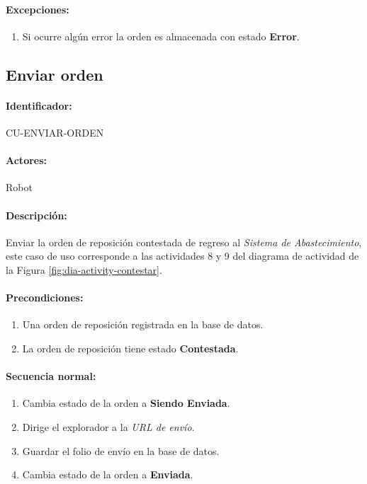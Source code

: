 \paragraph{Excepciones:}
\begin{enumerate}
  \item Si ocurre algún error la orden es almacenada con estado \textbf{Error}.
\end{enumerate}


\subsection{Enviar orden}\label{cu-enviar-orden}
\paragraph{Identificador:}
CU-ENVIAR-ORDEN
\paragraph{Actores:}
Robot
\paragraph{Descripción:}
Enviar la orden de reposición contestada de regreso al \textit{Sistema de Abastecimiento}, este caso de uso corresponde a las actividades 8 y 9 del diagrama de actividad de la Figura \ref{fig:dia-activity-contestar}.
\paragraph{Precondiciones:}
\begin{enumerate}
  \item Una orden de reposición registrada en la base de datos.
  \item La orden de reposición tiene estado \textbf{Contestada}.
\end{enumerate}
\paragraph{Secuencia normal:}
\begin{enumerate}
  \item Cambia estado de la orden a \textbf{Siendo Enviada}.
  \item Dirige el explorador a la \textit{URL de envío}.
  \item Guardar el folio de envío en la base de datos.
  \item Cambia estado de la orden a \textbf{Enviada}.
\end{enumerate}
